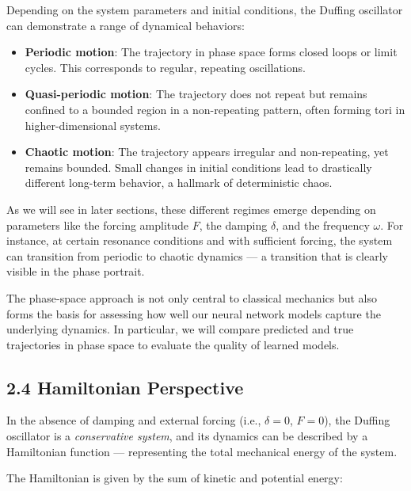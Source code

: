 \documentclass{article}
\begin{document}
Depending on the system parameters and initial conditions, the Duffing oscillator can demonstrate a range of dynamical behaviors:

\begin{itemize}
    \item \textbf{Periodic motion}: The trajectory in phase space forms closed loops or limit cycles. This corresponds to regular, repeating oscillations.
    \item \textbf{Quasi-periodic motion}: The trajectory does not repeat but remains confined to a bounded region in a non-repeating pattern, often forming tori in higher-dimensional systems.
    \item \textbf{Chaotic motion}: The trajectory appears irregular and non-repeating, yet remains bounded. Small changes in initial conditions lead to drastically different long-term behavior, a hallmark of deterministic chaos.
\end{itemize}

As we will see in later sections, these different regimes emerge depending on parameters like the forcing amplitude $F$, the damping $\delta$, and the frequency $\omega$. For instance, at certain resonance conditions and with sufficient forcing, the system can transition from periodic to chaotic dynamics — a transition that is clearly visible in the phase portrait.

The phase-space approach is not only central to classical mechanics but also forms the basis for assessing how well our neural network models capture the underlying dynamics. In particular, we will compare predicted and true trajectories in phase space to evaluate the quality of learned models.



\subsection{2.4 Hamiltonian Perspective}

In the absence of damping and external forcing (i.e., $\delta = 0$, $F = 0$), the Duffing oscillator is a \textit{conservative system}, and its dynamics can be described by a Hamiltonian function — representing the total mechanical energy of the system.

The Hamiltonian is given by the sum of kinetic and potential energy:
\end{document}
